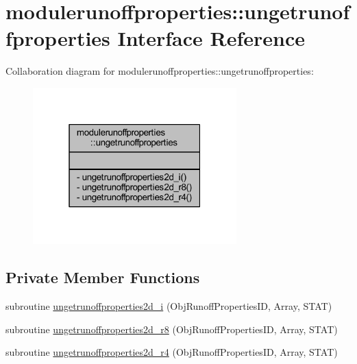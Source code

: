 \hypertarget{interfacemodulerunoffproperties_1_1ungetrunoffproperties}{}\section{modulerunoffproperties\+:\+:ungetrunoffproperties Interface Reference}
\label{interfacemodulerunoffproperties_1_1ungetrunoffproperties}


Collaboration diagram for modulerunoffproperties\+:\+:ungetrunoffproperties\+:\nopagebreak
\begin{figure}[H]
\begin{center}
\leavevmode
\includegraphics[width=223pt]{interfacemodulerunoffproperties_1_1ungetrunoffproperties__coll__graph}
\end{center}
\end{figure}
\subsection*{Private Member Functions}
\begin{DoxyCompactItemize}
\item 
subroutine \mbox{\hyperlink{interfacemodulerunoffproperties_1_1ungetrunoffproperties_ab2bc8dfb033139929e87cdfcf41481a8}{ungetrunoffproperties2d\+\_\+i}} (Obj\+Runoff\+Properties\+ID, Array, S\+T\+AT)
\item 
subroutine \mbox{\hyperlink{interfacemodulerunoffproperties_1_1ungetrunoffproperties_a92b1bb71569541d4cd9525321b8e7282}{ungetrunoffproperties2d\+\_\+r8}} (Obj\+Runoff\+Properties\+ID, Array, S\+T\+AT)
\item 
subroutine \mbox{\hyperlink{interfacemodulerunoffproperties_1_1ungetrunoffproperties_af5f0fea76a4d1b8544cb69ea2142c5a5}{ungetrunoffproperties2d\+\_\+r4}} (Obj\+Runoff\+Properties\+ID, Array, S\+T\+AT)
\end{DoxyCompactItemize}


